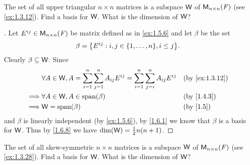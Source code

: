 \begin{ex}\label{ex:1.6.16}
  The set of all upper triangular \(n \times n\) matrices is a subspace \(\mathsf{W}\) of \(\mathsf{M}_{{n} \times n}({\mathit{F}})\) (see \cref{ex:1.3.12}).
  Find a basis for \(\mathsf{W}\).
  What is the dimension of \(\mathsf{W}\)?
\end{ex}

\begin{proof}[]
  Let \(E^{i j} \in \mathsf{M}_{{n} \times n}({\mathit{F}})\) be matrix defined as in \cref{ex:1.5.6} and let \(\beta\) be the set
  \[
    \beta = \set{E^{i j} : i, j \in \set{1, \dots, n}, i \leq j}.
  \]
  Clearly \(\beta \subseteq \mathsf{W}\).
  Since
  \begin{align*}
             & \forall A \in \W, A = \sum_{i = 1}^n \sum_{j = 1}^n A_{i j} E^{i j} = \sum_{i = 1}^n \sum_{j = i}^n A_{i j} E^{i j} &  & \text{(by \cref{ex:1.3.12})} \\
    \implies & \forall A \in \W, A \in \spn{\beta}                                                                                 &  & \text{(by \cref{1.4.3})}     \\
    \implies & \W = \spn{\beta}                                                                                                    &  & \text{(by \cref{1.5})}
  \end{align*}
  and \(\beta\) is linearly independent (by \cref{ex:1.5.6}), by \cref{1.6.1} we know that \(\beta\) is a basis for \(\mathsf{W}\).
  Thus by \cref{1.6.8} we have \(\dim(\mathsf{W}) = \frac{1}{2} n(n + 1)\).
\end{proof}

\begin{ex}\label{ex:1.6.17}
  The set of all skew-symmetric \(n \times n\) matrices is a subspace \(\mathsf{W}\) of \(\mathsf{M}_{{n} \times n}({\mathit{F}})\) (see \cref{ex:1.3.28}).
  Find a basis for \(\mathsf{W}\).
  What is the dimension of \(\mathsf{W}\)?
\end{ex}

